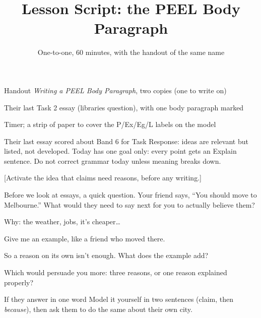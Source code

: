 \documentclass{tutordesk}
\title{Lesson Script: the PEEL Body Paragraph}
\subtitle{One-to-one, 60 minutes, with the handout of the same name}
\begin{document}
\maketitle

\runningorder

\begin{materials}
  \item Handout \emph{Writing a PEEL Body Paragraph}, two copies (one to write on)
  \item Their last Task 2 essay (libraries question), with one body paragraph marked
  \item Timer; a strip of paper to cover the P/Ex/Eg/L labels on the model
\end{materials}

\begin{teachernote}
Their last essay scored about Band 6 for Task Response: ideas are relevant but listed, not
developed. Today has one goal only: every point gets an Explain sentence. Do not correct
grammar today unless meaning breaks down.
\end{teachernote}

[Activate the idea that claims need reasons, before any writing.]

\begin{say}
Before we look at essays, a quick question. Your friend says, \enquote{You should move to
Melbourne.} What would they need to say next for you to actually believe them?
\end{say}

\begin{expect}
  \item Why: the weather, jobs, it's cheaper\dots
  \item Give me an example, like a friend who moved there.
\end{expect}

\begin{probe}
  \item So a reason on its own isn't enough. What does the example add?
  \item Which would persuade you more: three reasons, or one reason explained properly?
\end{probe}

\begin{fallback}{If they answer in one word}
Model it yourself in two sentences (claim, then \emph{because}), then ask them to do the same
about their own city.
\end{fallback}
\end{document}
